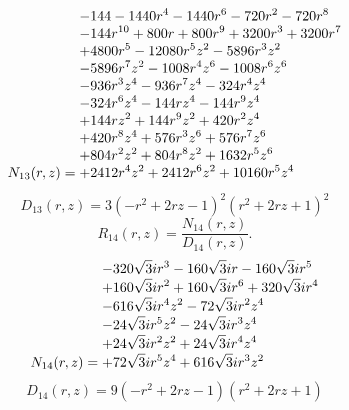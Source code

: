\documentclass[11pt,a4paper]{article}
\begin{document}
\begin{equation}
N_{13}(r,z)=\shortstack[l]{$\displaystyle  - 144 - 1440 r^{4} - 1440 r^{6} - 720 r^{2} - 720 r^{8}$\\
$\displaystyle  - 144 r^{10} + 800 r + 800 r^{9} + 3200 r^{3} + 3200 r^{7}$\\
$\displaystyle  + 4800 r^{5} - 12080 r^{5} z^{2} - 5896 r^{3} z^{2}$\\
$\displaystyle  - 5896 r^{7} z^{2} - 1008 r^{4} z^{6} - 1008 r^{6} z^{6}$\\
$\displaystyle  - 936 r^{3} z^{4} - 936 r^{7} z^{4} - 324 r^{4} z^{4}$\\
$\displaystyle  - 324 r^{6} z^{4} - 144 r z^{4} - 144 r^{9} z^{4}$\\
$\displaystyle  + 144 r z^{2} + 144 r^{9} z^{2} + 420 r^{2} z^{4}$\\
$\displaystyle  + 420 r^{8} z^{4} + 576 r^{3} z^{6} + 576 r^{7} z^{6}$\\
$\displaystyle  + 804 r^{2} z^{2} + 804 r^{8} z^{2} + 1632 r^{5} z^{6}$\\
$\displaystyle  + 2412 r^{4} z^{2} + 2412 r^{6} z^{2} + 10160 r^{5} z^{4}$}
\label{eq:cat-numerator-13}
\end{equation}
\begin{equation}
D_{13}(r,z)=3 \left(- r^{2} + 2 r z - 1\right)^{2} \left(r^{2} + 2 r z + 1\right)^{2}
\label{eq:cat-denominator-13}
\end{equation}
\begin{equation}
R_{14}(r,z)=\frac{N_{14}(r,z)}{D_{14}(r,z)}.
\label{eq:cat-rational-14}
\end{equation}
\begin{equation}
N_{14}(r,z)=\shortstack[l]{$\displaystyle  - 320 \sqrt{3} i r^{3} - 160 \sqrt{3} i r - 160 \sqrt{3} i r^{5}$\\
$\displaystyle  + 160 \sqrt{3} i r^{2} + 160 \sqrt{3} i r^{6} + 320 \sqrt{3} i r^{4}$\\
$\displaystyle  - 616 \sqrt{3} i r^{4} z^{2} - 72 \sqrt{3} i r^{2} z^{4}$\\
$\displaystyle  - 24 \sqrt{3} i r^{5} z^{2} - 24 \sqrt{3} i r^{3} z^{4}$\\
$\displaystyle  + 24 \sqrt{3} i r^{2} z^{2} + 24 \sqrt{3} i r^{4} z^{4}$\\
$\displaystyle  + 72 \sqrt{3} i r^{5} z^{4} + 616 \sqrt{3} i r^{3} z^{2}$}
\label{eq:cat-numerator-14}
\end{equation}
\begin{equation}
D_{14}(r,z)=9 \left(- r^{2} + 2 r z - 1\right) \left(r^{2} + 2 r z + 1\right)
\label{eq:cat-denominator-14}
\end{equation}
\end{document}
